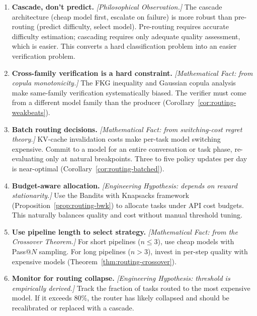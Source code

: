 \begin{enumerate}[nosep]
\item \textbf{Cascade, don't predict.} \emph{[Philosophical Observation.]} The cascade architecture (cheap model first, escalate on failure) is more robust than pre-routing (predict difficulty, select model). Pre-routing requires accurate difficulty estimation; cascading requires only adequate quality assessment, which is easier. This converts a hard classification problem into an easier verification problem.

\item \textbf{Cross-family verification is a hard constraint.} \emph{[Mathematical Fact: from copula monotonicity.]} The FKG inequality and Gaussian copula analysis make same-family verification systematically biased. The verifier must come from a different model family than the producer (Corollary~\ref{cor:routing-weakbeats}).

\item \textbf{Batch routing decisions.} \emph{[Mathematical Fact: from switching-cost regret theory.]} KV-cache invalidation costs make per-task model switching expensive. Commit to a model for an entire conversation or task phase, re-evaluating only at natural breakpoints. Three to five policy updates per day is near-optimal (Corollary~\ref{cor:routing-batched}).

\item \textbf{Budget-aware allocation.} \emph{[Engineering Hypothesis: depends on reward stationarity.]} Use the Bandits with Knapsacks framework (Proposition~\ref{prop:routing-bwk}) to allocate tasks under API cost budgets. This naturally balances quality and cost without manual threshold tuning.

\item \textbf{Use pipeline length to select strategy.} \emph{[Mathematical Fact: from the Crossover Theorem.]} For short pipelines ($n \leq 3$), use cheap models with Pass@$N$ sampling. For long pipelines ($n > 3$), invest in per-step quality with expensive models (Theorem~\ref{thm:routing-crossover}).

\item \textbf{Monitor for routing collapse.} \emph{[Engineering Hypothesis: threshold is empirically derived.]} Track the fraction of tasks routed to the most expensive model. If it exceeds 80\%, the router has likely collapsed and should be recalibrated or replaced with a cascade.
\end{enumerate}

